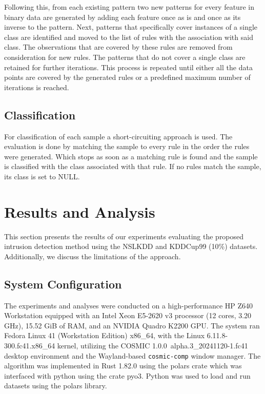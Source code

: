 \documentclass[pdflatex,sn-mathphys-num]{sn-jnl}%
\theoremstyle{thmstyleone}%
\theoremstyle{thmstyletwo}%
\theoremstyle{thmstylethree}%
\begin{document}
Following this, from each existing pattern two new patterns for every feature in binary data are generated by adding each feature once as is and once as its inverse to the pattern.
Next, patterns that specifically cover instances of a single class are identified and moved to the list of rules with the association with said class.
The observations that are covered by these rules are removed from consideration for new rules.
The patterns that do not cover a single class are retained for further iterations.
This process is repeated until either all the data points are covered by the generated rules or a predefined maximum number of iterations is reached.

\subsection{Classification}
For classification of each sample a short-circuiting approach is used.
The evaluation is done by matching the sample to every rule in the order the rules were generated.
Which stops as soon as a matching rule is found and the sample is classified with the class associated with that rule.
If no rules match the sample, its class is set to NULL.


\section{Results and Analysis}\label{sec:Results}
This section presents the results of our experiments evaluating the proposed intrusion detection method using the NSLKDD and KDDCup99 (10\%) datasets.
Additionally, we discuss the limitations of the approach.


\subsection{System Configuration}

The experiments and analyses were conducted on a high-performance HP Z640 Workstation equipped with an Intel Xeon E5-2620 v3 processor (12 cores, 3.20 GHz), 15.52 GiB of RAM, and an NVIDIA Quadro K2200 GPU. The system ran Fedora Linux 41 (Workstation Edition) x86\_64, with the Linux 6.11.8-300.fc41.x86\_64 kernel, utilizing the COSMIC 1.0.0~alpha.3\_20241120-1.fc41 desktop environment and the Wayland-based \texttt{cosmic-comp} window manager.
The algorithm was implemented in Rust 1.82.0 using the polars crate which was interfaced with python using the crate pyo3. Python was used to load and run datasets using the polars library.
\end{document}
